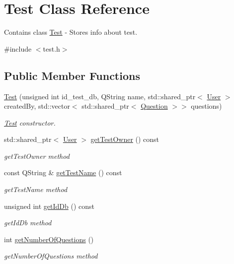 \hypertarget{class_test}{}\section{Test Class Reference}
\label{class_test}


Contains class \hyperlink{class_test}{Test} -\/ Stores info about test.  




{\ttfamily \#include $<$test.\+h$>$}

\subsection*{Public Member Functions}
\begin{DoxyCompactItemize}
\item 
\hyperlink{class_test_a8cf3248024edbd90bb067572c353eb52}{Test} (unsigned int id\+\_\+test\+\_\+db, Q\+String name, std\+::shared\+\_\+ptr$<$ \hyperlink{class_user}{User} $>$ created\+By, std\+::vector$<$ std\+::shared\+\_\+ptr$<$ \hyperlink{class_question}{Question} $>$$>$ questions)
\begin{DoxyCompactList}\small\item\em \hyperlink{class_test}{Test} constructor. \end{DoxyCompactList}\item 
std\+::shared\+\_\+ptr$<$ \hyperlink{class_user}{User} $>$ \hyperlink{class_test_a1c8e2f9b62f0643ca5e2e1484e996df6}{get\+Test\+Owner} () const
\begin{DoxyCompactList}\small\item\em get\+Test\+Owner method \end{DoxyCompactList}\item 
const Q\+String \& \hyperlink{class_test_a022aa62fa86d7436c33ba58f8e410389}{get\+Test\+Name} () const
\begin{DoxyCompactList}\small\item\em get\+Test\+Name method \end{DoxyCompactList}\item 
unsigned int \hyperlink{class_test_a00aae8f1d964e34600ca99354e0aff66}{get\+Id\+Db} () const
\begin{DoxyCompactList}\small\item\em get\+Id\+Db method \end{DoxyCompactList}\item 
int \hyperlink{class_test_a9dea10c897bfbd2a7fa669c1b49a4b80}{get\+Number\+Of\+Questions} ()
\begin{DoxyCompactList}\small\item\em get\+Number\+Of\+Questions method \end{DoxyCompactList}\item 
$$
\end{DoxyCompactItemize}
